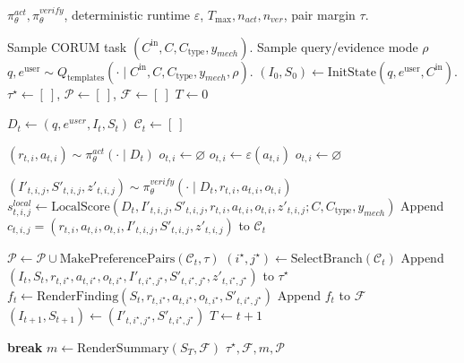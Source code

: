 \documentclass[thesis,letterpaper,12pt]{utthesis}
\begin{document}
\begin{algorithm}
\caption{Trajectory Generation for SFT and DPO}\label{alg:trajectory-gen}
\begin{algorithmic}
    \Require $\pi^{act}_\theta, \pi^{verify}_\theta$, deterministic runtime $\varepsilon$, $T_{\max}, n_{act}, n_{ver}$, pair margin $\tau$.

    \State Sample CORUM task $(C^\text{in}, C, C_\text{type}, y_{mech})$.
    \State Sample query/evidence mode $\rho$
    \State $q, e^\text{user} \sim Q_\text{templates}(\cdot \mid C^\text{in}, C, C_\text{type}, y_{mech}, \rho)$.
    \State $(I_0, S_0) \gets \mathrm{InitState}(q, e^\text{user}, C^\text{in})$.
    \State $\tau^\star \gets [\ ]$, \quad $\mathcal{P} \gets [\ ]$, \quad $\mathcal{F} \gets [\ ]$
    \State $T \gets 0$

        \State $D_t \gets (q, e^{user}, I_t, S_t)$
        \State $\mathcal{C}_t \gets [\ ]$

            \State $(r_{t,i}, a_{t,i}) \sim \pi^{act}_\theta(\cdot \mid D_t)$
                \State $o_{t,i} \gets \varnothing$
                \State $o_{t,i} \gets \varepsilon(a_{t,i})$
            \Else
                \State $o_{t,i} \gets \varnothing$
            \EndIf

               \State $(I'_{t,i,j}, S'_{t,i,j}, z'_{t,i,j}) \sim \pi^{verify}_\theta(\cdot \mid D_t, r_{t,i}, a_{t,i}, o_{t,i})$
               \State $s^{local}_{t,i,j} \gets \mathrm{LocalScore}(D_t, I'_{t,i,j}, S'_{t,i,j}, r_{t,i}, a_{t,i}, o_{t,i}, z'_{t,i,j}; C, C_{\text{type}}, y_{mech})$
               \State Append $c_{t,i,j} = (r_{t,i}, a_{t,i}, o_{t,i}, I'_{t,i,j}, S'_{t,i,j}, z'_{t,i,j})$ to $\mathcal{C}_t$
            \EndFor
        \EndFor

        \State $\mathcal{P} \gets \mathcal{P} \cup \mathrm{MakePreferencePairs}(\mathcal{C}_t, \tau)$
        \State $(i^\star, j^\star) \gets \mathrm{SelectBranch}(\mathcal{C}_t)$
        \State Append $(I_t, S_t, r_{t, i^\star}, a_{t, i^\star}, o_{t, i^\star}, I'_{t, i^\star, j^\star}, S'_{t, i^\star, j^\star}, z'_{t, i^\star, j^\star})$ to $\tau^\star$
        \State $f_t \gets \mathrm{RenderFinding}(S_t, r_{t, i^\star}, a_{t,i^\star}, o_{t,i^\star}, S'_{t,i^\star,j^\star})$
        \State Append $f_t$ to $\mathcal{F}$
        \State $(I_{t+1}, S_{t+1}) \gets (I'_{t,i^\star,j^\star}, S'_{t,i^\star,j^\star})$
        \State $T \gets t+1$

            \State \textbf{break}
        \EndIf
    \EndFor
    \State $m \gets \mathrm{RenderSummary}(S_T, \mathcal{F})$
    \State \Return $\tau^\star, \mathcal{F}, m, \mathcal{P}$
\end{algorithmic}
\end{algorithm}
\end{document}
